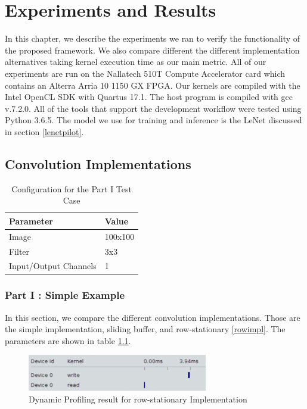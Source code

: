 
\chapter{Experiments and Results} %

\label{Chapter4} %

In this chapter, we describe the experiments we ran to verify the functionality of the proposed framework. We also compare different the different implementation alternatives taking kernel execution time as our main metric. All of our experiments are run on the Nallatech 510T Compute Accelerator card which contains an Alterra Arria 10 1150 GX FPGA. Our kernels are compiled with the Intel OpenCL SDK with Quartus 17.1. The host program is compiled with gcc v.7.2.0. All of the tools that support the development workflow were tested using Python 3.6.5. 
The model we use for training and inference is the LeNet discussed in section \ref{lenetpilot}.


\section{Convolution Implementations}

\begin{table}[]
\centering
\begin{tabular}{|l|l|}
\hline
\textbf{Parameter}    & \textbf{Value} \\ \hline
Image                 & 100x100        \\ \hline
Filter                & 3x3            \\ \hline
Input/Output Channels & 1              \\ \hline
\end{tabular}
\caption{Configuration for the Part I Test Case}
\label{tab:partoneconfig}
\end{table}

\subsection{Part I : Simple Example} \label{testone}
In this section, we compare the different convolution implementations. Those are the simple implementation, sliding buffer, and row-stationary \ref{rowimpl}. The parameters are shown in table \ref{tab:partoneconfig}. 

\begin{figure}[h]
\centering
\includegraphics[width=0.7\textwidth]{Figures/profilerow}
\decoRule
\caption[profilerow]{ Dynamic Profiling result for row-stationary Implementation}
\label{fig:rowstatp}
\end{figure}

